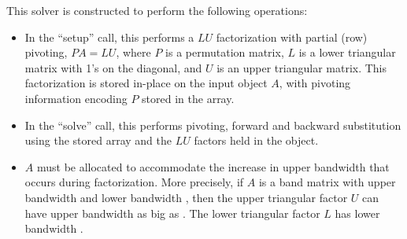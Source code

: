 This solver is constructed to perform the following operations:
\begin{itemize}
\item In the ``setup'' call, this performs a $LU$ factorization with
  partial (row) pivoting, $PA=LU$, where $P$ is a permutation matrix,
  $L$ is a lower triangular matrix with 1's on the diagonal, and $U$
  is an upper triangular matrix.  This factorization is stored
  in-place on the input {\sunmatband} object $A$, with pivoting
  information encoding $P$ stored in the  array.
\item In the ``solve'' call, this performs pivoting, forward and
  backward substitution using the stored  array and the
  $LU$ factors held in the {\sunmatband} object.
\item
  {\warn} $A$ must be allocated to accommodate the increase in upper
  bandwidth that occurs during factorization.  More precisely, if $A$
  is a band matrix with upper bandwidth  and lower bandwidth
  , then the upper triangular factor $U$ can have upper
  bandwidth as big as . The lower triangular
  factor $L$ has lower bandwidth .
\end{itemize}


